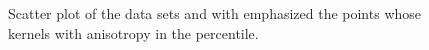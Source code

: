 \begin{figure}
\begin{subfigure}{0.23\textwidth}
			\caption{\anisotropyTwo}
			\label{fig:discussion:anisotropy:anisotropy2}
		\end{subfigure}	
		\caption{Scatter plot of the data sets  \anisotropyOne and  \anisotropyTwo with emphasized the points whose kernels with anisotropy in the  percentile.}
		\label{fig:discussion:anisotropy:anisotropy}
	\end{figure}

